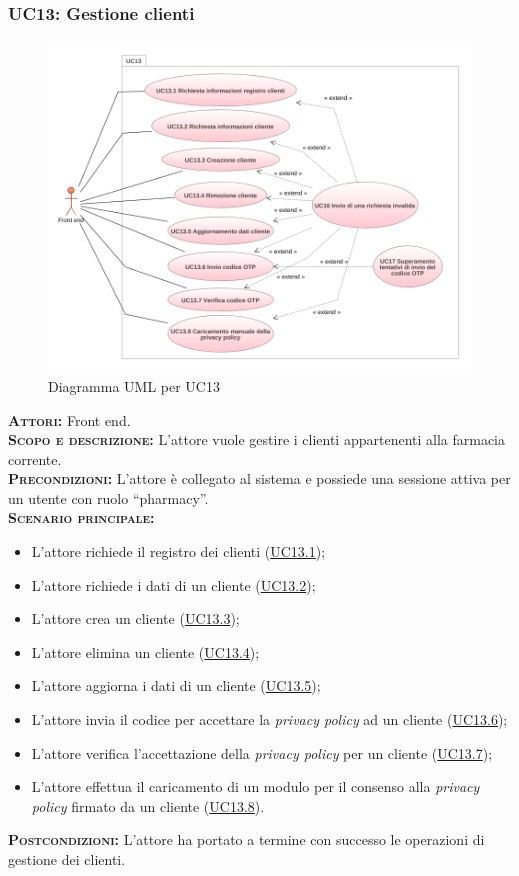 \subsubsection{UC13: Gestione clienti}
\label{sec:UC13}
\begin{figure}[h!]
    \centering
    \includegraphics[width=\textwidth]{figures/uc/uc13.png}
    \caption[Diagramma UML per UC13]{Diagramma UML per UC13
    \label{fig:uc13}}
\end{figure}
\textsc{\textbf{Attori:}} Front end.\\
\textsc{\textbf{Scopo e descrizione:}} L'attore vuole gestire i clienti appartenenti alla farmacia corrente.\\
\textsc{\textsc{\textbf{Precondizioni:}}} L'attore è collegato al sistema e possiede una sessione attiva per un utente con ruolo ``pharmacy''.\\
\textsc{\textbf{Scenario principale:}}
\begin{itemize}
    \item L'attore richiede il registro dei clienti (\hyperref[sec:UC131]{UC13.1});
    \item L'attore richiede i dati di un cliente (\hyperref[sec:UC132]{UC13.2});
    \item L'attore crea un cliente (\hyperref[sec:UC133]{UC13.3});
    \item L'attore elimina un cliente (\hyperref[sec:UC134]{UC13.4});
    \item L'attore aggiorna i dati di un cliente (\hyperref[sec:UC135]{UC13.5});
    \item L'attore invia il codice per accettare la \textit{privacy policy} ad un cliente (\hyperref[sec:UC136]{UC13.6});
    \item L'attore verifica l'accettazione della \textit{privacy policy} per un cliente (\hyperref[sec:UC137]{UC13.7});
    \item L'attore effettua il caricamento di un modulo per il consenso alla \textit{privacy policy} firmato da un cliente (\hyperref[sec:UC138]{UC13.8}).
\end{itemize}
\textsc{\textbf{Postcondizioni:}} L'attore ha portato a termine con successo le operazioni di gestione dei clienti.

